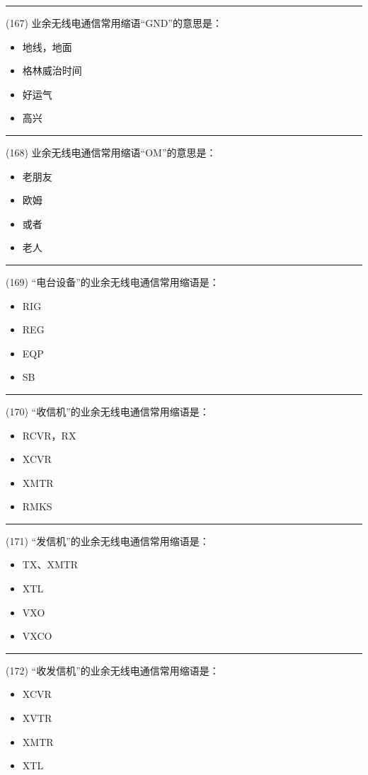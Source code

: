 \documentclass[twocolumn]{ctexart}  %
\begin{document}
\noindent\rule{0.5\textwidth}{1pt}
\heiti (167) 业余无线电通信常用缩语“GND”的意思是： \songti {\color{gray} [LK0361] }
\begin{itemize}
	\item  地线，地面
	\item  格林威治时间
	\item  好运气
	\item  高兴
\end{itemize}


\noindent\rule{0.5\textwidth}{1pt}
\heiti (168) 业余无线电通信常用缩语“OM”的意思是： \songti {\color{gray} [LK0373] }
\begin{itemize}
	\item  老朋友
	\item  欧姆
	\item  或者
	\item  老人
\end{itemize}


\noindent\rule{0.5\textwidth}{1pt}
\heiti (169) “电台设备”的业余无线电通信常用缩语是： \songti {\color{gray} [LK0376] }
\begin{itemize}
	\item  RIG
	\item  REG
	\item  EQP
	\item  SB
\end{itemize}


\noindent\rule{0.5\textwidth}{1pt}
\heiti (170) “收信机”的业余无线电通信常用缩语是： \songti {\color{gray} [LK0379] }
\begin{itemize}
	\item  RCVR，RX
	\item  XCVR
	\item  XMTR
	\item  RMKS
\end{itemize}


\noindent\rule{0.5\textwidth}{1pt}
\heiti (171) “发信机”的业余无线电通信常用缩语是： \songti {\color{gray} [LK0380] }
\begin{itemize}
	\item  TX、XMTR
	\item  XTL
	\item  VXO
	\item  VXCO
\end{itemize}


\noindent\rule{0.5\textwidth}{1pt}
\heiti (172) “收发信机”的业余无线电通信常用缩语是： \songti {\color{gray} [LK0381] }
\begin{itemize}
	\item  XCVR
	\item  XVTR
	\item  XMTR
	\item  XTL
\end{itemize}
\end{document}
